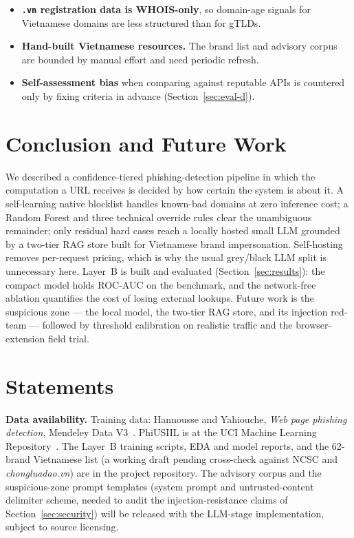 \documentclass[conference]{IEEEtran}
\begin{document}
\begin{itemize}
on a consumer GPU is not guaranteed, and the suspicious zone needs a running
local model service on compatible hardware.
\item \textbf{\texttt{.vn} registration data is WHOIS-only}, so domain-age
signals for Vietnamese domains are less structured than for gTLDs.
\item \textbf{Hand-built Vietnamese resources.} The brand list and advisory
corpus are bounded by manual effort and need periodic refresh.
\item \textbf{Self-assessment bias} when comparing against reputable APIs is
countered only by fixing criteria in advance (Section~\ref{sec:eval-d}).
\end{itemize}

\section{Conclusion and Future Work}
We described a confidence-tiered phishing-detection pipeline in which the
computation a URL receives is decided by how certain the system is about it. A
self-learning native blocklist handles known-bad domains at zero inference cost;
a Random Forest and three technical override rules clear the unambiguous
remainder; only residual hard cases reach a locally hosted small LLM grounded by
a two-tier RAG store built for Vietnamese brand impersonation. Self-hosting
removes per-request pricing, which is why the usual grey/black LLM split is
unnecessary here. Layer~B is built and evaluated (Section~\ref{sec:results}): the
compact model holds ROC-AUC on the benchmark, and the network-free ablation
quantifies the cost of losing external lookups. Future work is the suspicious
zone --- the local model, the two-tier RAG store, and its injection red-team ---
followed by threshold calibration on realistic traffic and the browser-extension
field trial.

\section*{Statements}
\textbf{Data availability.} Training data: Hannousse and Yahiouche, \emph{Web page
phishing detection}, Mendeley Data V3~\cite{hannousse2021dataset}. PhiUSIIL is at
the UCI Machine Learning Repository~\cite{prasad2024phiusiil}. The Layer~B
training scripts, EDA and model reports, and the 62-brand Vietnamese list (a
working draft pending cross-check against NCSC and \emph{chongluadao.vn}) are in
the project repository. The advisory corpus and the suspicious-zone prompt
templates (system prompt and untrusted-content delimiter scheme, needed to audit
the injection-resistance claims of Section~\ref{sec:security}) will be released
with the LLM-stage implementation, subject to source licensing.
\end{document}
